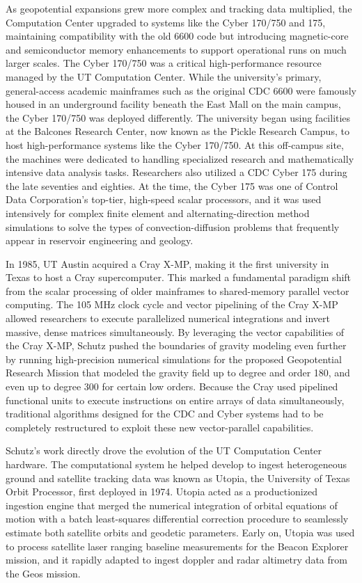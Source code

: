 As geopotential expansions grew more complex and tracking data multiplied, the Computation Center upgraded to systems like the Cyber 170/750 and 175, maintaining compatibility with the old 6600 code but introducing magnetic-core and semiconductor memory enhancements to support operational runs on much larger scales. The Cyber 170/750 was a critical high-performance resource managed by the UT Computation Center. While the university's primary, general-access academic mainframes such as the original CDC 6600 were famously housed in an underground facility beneath the East Mall on the main campus, the Cyber 170/750 was deployed differently. The university began using facilities at the Balcones Research Center, now known as the Pickle Research Campus, to host high-performance systems like the Cyber 170/750. At this off-campus site, the machines were dedicated to handling specialized research and mathematically intensive data analysis tasks. Researchers also utilized a CDC Cyber 175 during the late seventies and eighties. At the time, the Cyber 175 was one of Control Data Corporation’s top-tier, high-speed scalar processors, and it was used intensively for complex finite element and alternating-direction method simulations to solve the types of convection-diffusion problems that frequently appear in reservoir engineering and geology.

In 1985, UT Austin acquired a Cray X-MP, making it the first university in Texas to host a Cray supercomputer. This marked a fundamental paradigm shift from the scalar processing of older mainframes to shared-memory parallel vector computing. The 105 MHz clock cycle and vector pipelining of the Cray X-MP allowed researchers to execute parallelized numerical integrations and invert massive, dense matrices simultaneously. By leveraging the vector capabilities of the Cray X-MP, Schutz pushed the boundaries of gravity modeling even further by running high-precision numerical simulations for the proposed Geopotential Research Mission that modeled the gravity field up to degree and order 180, and even up to degree 300 for certain low orders. Because the Cray used pipelined functional units to execute instructions on entire arrays of data simultaneously, traditional algorithms designed for the CDC and Cyber systems had to be completely restructured to exploit these new vector-parallel capabilities.

Schutz's work directly drove the evolution of the UT Computation Center hardware. The computational system he helped develop to ingest heterogeneous ground and satellite tracking data was known as Utopia, the University of Texas Orbit Processor, first deployed in 1974. Utopia acted as a productionized ingestion engine that merged the numerical integration of orbital equations of motion with a batch least-squares differential correction procedure to seamlessly estimate both satellite orbits and geodetic parameters. Early on, Utopia was used to process satellite laser ranging baseline measurements for the Beacon Explorer mission, and it rapidly adapted to ingest doppler and radar altimetry data from the Geos mission.

